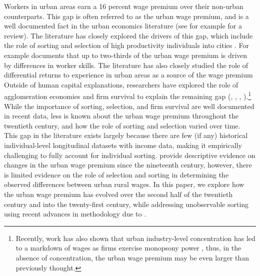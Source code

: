 \documentclass[12pt,twoside]{article}
\begin{document}
Workers in urban areas earn a 16 percent wage premium over their non-urban counterparts.
This gap is often referred to as the urban wage premium, and is a well documented fact in the urban economics literature (see for example \citet{rosenthal2004evidence} for a review). 
The literature has closely explored the drivers of this gap, which include the role of sorting and selection of high productivity individuals into cities \citep{Combes_Duranton_Gobillon_2008}. 
For example \citet{Yankow_2006} documents that up to two-thirds of the urban wage premium is driven by differences in worker skills. 
The literature has also closely studied the role of differential returns to experience in urban areas as a source of the wage premium \citep{Baum-Snow_Pavan_2012}
Outside of human capital explanations, researchers have explored the role of agglomeration economies and firm survival to explain the remaining gap (\citet{Glaeser_Mare_2001}, \citet{wheaton2002urban}, \citet{combes2012productivity}, \citet{behrens2014productive}).\footnote{ Recently, work has also shown that urban industry-level concentration has led to a markdown of wages as firms exercise monopsony power \citet{azar2020labor}, thus, in the absence of concentration, the urban wage premium may be even larger than previously thought.} 
While the importance of sorting, selection, and firm survival are well documented in recent data, less is known about the urban wage premium throughout the twentieth century, and how the role of sorting and selection varied over time.  
This gap in the literature exists largely because there are few (if any) historical individual-level longitudinal datasets with income data, making it empirically challenging to fully account for individual sorting.
\cite{Boustan_Bunten_Hearey_2013} provide descriptive evidence on changes in the urban wage premium since the nineteenth century, however, there is limited evidence on the role of selection and sorting in determining the observed differences between urban rural wages.
In this paper, we explore how the urban wage premium has evolved over the second half of the twentieth century and into the twenty-first century, while addressing unobservable sorting using recent advances in methodology due to \citet{altonji2018estimating}. 
\end{document}
